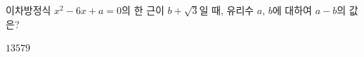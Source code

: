 이차방정식 $x^2-6x+a=0$의 한 근이 $b+\sqrt{3}$일 때, 유리수 $a$, $b$에 대하여 $a-b$의 값은?
\begin{choices32}{$1$}{$3$}{$5$}{$7$}{$9$}\end{choices32}
